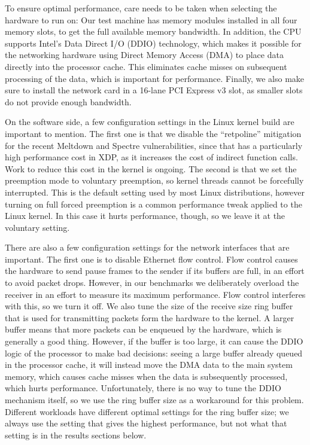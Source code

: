 \documentclass[10pt,sigconf]{acmart}
\begin{document}
To ensure optimal performance, care needs to be taken when selecting the
hardware to run on: Our test machine has memory modules installed in all four
memory slots, to get the full available memory bandwidth. In addition, the CPU
supports Intel's Data Direct I/O (DDIO) technology, which makes it possible for
the networking hardware using Direct Memory Access (DMA) to place data directly
into the processor cache. This eliminates cache misses on subsequent processing
of the data, which is important for performance. Finally, we also make sure to
install the network card in a 16-lane PCI Express v3 slot, as smaller slots do
not provide enough bandwidth.

On the software side, a few configuration settings in the Linux kernel build are
important to mention. The first one is that we disable the ``retpoline''
mitigation for the recent Meltdown and Spectre vulnerabilities, since that has a
particularly high performance cost in XDP, as it increases the cost of indirect
function calls. Work to reduce this cost in the kernel is ongoing. The second is
that we set the preemption mode to voluntary preemption, so kernel threads
cannot be forcefully interrupted. This is the default setting used by most Linux
distributions, however turning on full forced preemption is a common performance
tweak applied to the Linux kernel. In this case it hurts performance, though, so
we leave it at the voluntary setting.

There are also a few configuration settings for the network interfaces that are
important. The first one is to disable Ethernet flow control. Flow control
causes the hardware to send pause frames to the sender if its buffers are full,
in an effort to avoid packet drops. However, in our benchmarks we deliberately
overload the receiver in an effort to measure its maximum performance. Flow
control interferes with this, so we turn it off. We also tune the size of the
receive size ring buffer that is used for transmitting packets form the hardware
to the kernel. A larger buffer means that more packets can be enqueued by the
hardware, which is generally a good thing. However, if the buffer is too large,
it can cause the DDIO logic of the processor to make bad decisions: seeing a
large buffer already queued in the processor cache, it will instead move the DMA
data to the main system memory, which causes cache misses when the data is
subsequently processed, which hurts performance. Unfortunately, there is no way
to tune the DDIO mechanism itself, so we use the ring buffer size as a
workaround for this problem. Different workloads have different optimal settings
for the ring buffer size; we always use the setting that gives the highest
performance, but not what that setting is in the results sections below.
\end{document}
